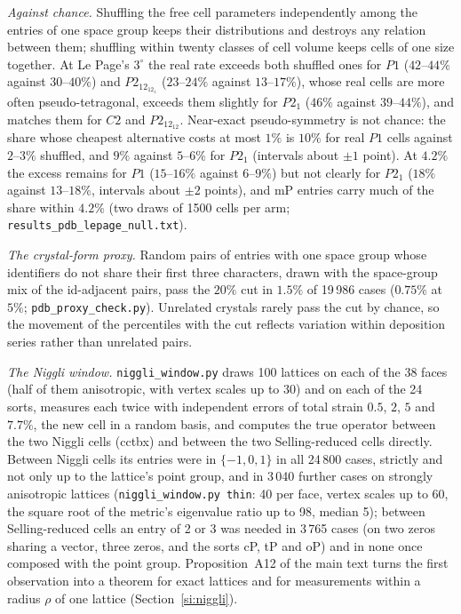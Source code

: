 \documentclass[preprint,pdf]{iucr}          %
\begin{document}
\emph{Against chance.} Shuffling the free cell parameters independently among the entries of one space group keeps their distributions and destroys any relation between them; shuffling within twenty classes of cell volume keeps cells of one size together. At Le Page's $3^\circ$ the real rate exceeds both shuffled ones for $P1$ ($42$--$44\%$ against $30$--$40\%$) and $P2_12_12_1$ ($23$--$24\%$ against $13$--$17\%$), whose real cells are more often pseudo-tetragonal, exceeds them slightly for $P2_1$ ($46\%$ against $39$--$44\%$), and matches them for $C2$ and $P2_12_12$. Near-exact pseudo-symmetry is not chance: the share whose cheapest alternative costs at most $1\%$ is $10\%$ for real $P1$ cells against $2$--$3\%$ shuffled, and $9\%$ against $5$--$6\%$ for $P2_1$ (intervals about $\pm1$ point). At $4.2\%$ the excess remains for $P1$ ($15$--$16\%$ against $6$--$9\%$) but not clearly for $P2_1$ ($18\%$ against $13$--$18\%$, intervals about $\pm2$ points), and mP entries carry much of the share within $4.2\%$ (two draws of 1500 cells per arm; \texttt{results\_\allowbreak pdb\_\allowbreak lepage\_\allowbreak null.txt}).

\emph{The crystal-form proxy.} Random pairs of entries with one space group whose identifiers do not share their first three characters, drawn with the space-group mix of the id-adjacent pairs, pass the $20\%$ cut in $1.5\%$ of 19\,986 cases ($0.75\%$ at $5\%$; \texttt{pdb\_\allowbreak proxy\_\allowbreak check.py}). Unrelated crystals rarely pass the cut by chance, so the movement of the percentiles with the cut reflects variation within deposition series rather than unrelated pairs.

\emph{The Niggli window.} \texttt{niggli\_window.py} draws 100 lattices on each of the 38 faces (half of them anisotropic, with vertex scales up to 30) and on each of the 24 sorts, measures each twice with independent errors of total strain $0.5$, $2$, $5$ and $7.7\%$, the new cell in a random basis, and computes the true operator between the two Niggli cells (cctbx) and between the two Selling-reduced cells directly. Between Niggli cells its entries were in $\{-1,0,1\}$ in all 24\,800 cases, strictly and not only up to the lattice's point group, and in 3\,040 further cases on strongly anisotropic lattices (\texttt{niggli\_window.py thin}: 40 per face, vertex scales up to 60, the square root of the metric's eigenvalue ratio up to 98, median 5); between Selling-reduced cells an entry of 2 or 3 was needed in 3\,765 cases (on two zeros sharing a vector, three zeros, and the sorts cP, tP and oP) and in none once composed with the point group. Proposition~A12 of the main text turns the first observation into a theorem for exact lattices and for measurements within a radius $\rho$ of one lattice (Section~\ref{si:niggli}).
\end{document}
